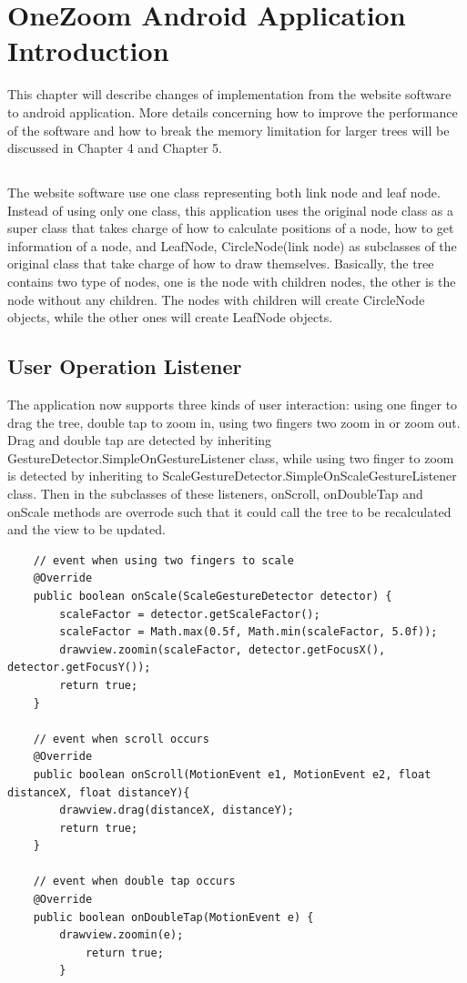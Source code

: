 \documentclass[MSc]{icldt}
\begin{document}
\chapter{OneZoom Android Application Introduction}

This chapter will describe changes of implementation from the website software to android application. More details concerning how to improve the performance of the software and how to break the memory limitation for larger trees will be discussed in Chapter 4 and Chapter 5.

\section{ }


The website software use one class representing both link node and leaf node. Instead of using only one class, this application uses the original node class as a super class that takes charge of how to calculate positions of a node, how to get information of a node, and LeafNode, CircleNode(link node) as subclasses of the original class that take charge of how to draw themselves. Basically, the tree contains two type of nodes, one is the node with children nodes, the other is the node without any children. The nodes with children will create CircleNode objects, while the other ones will create LeafNode objects. 

\section{User Operation Listener}

The application now supports three kinds of user interaction: using one finger to drag the tree, double tap to zoom in, using two fingers two zoom in or zoom out. Drag and double tap are detected by inheriting GestureDetector.SimpleOnGestureListener class, while using two finger to zoom is detected by inheriting to ScaleGestureDetector.SimpleOnScaleGestureListener class. Then in the subclasses of these listeners, onScroll, onDoubleTap and onScale methods are overrode such that it could call the tree to be recalculated and the view to be updated. 

\begin{lstlisting}
	// event when using two fingers to scale
	@Override
	public boolean onScale(ScaleGestureDetector detector) {
		scaleFactor = detector.getScaleFactor();
		scaleFactor = Math.max(0.5f, Math.min(scaleFactor, 5.0f));
		drawview.zoomin(scaleFactor, detector.getFocusX(), detector.getFocusY());
		return true;
	}
	
	// event when scroll occurs
	@Override
	public boolean onScroll(MotionEvent e1, MotionEvent e2, float distanceX, float distanceY){
		drawview.drag(distanceX, distanceY);
		return true;
	}
	
	// event when double tap occurs    
	@Override
	public boolean onDoubleTap(MotionEvent e) {
		drawview.zoomin(e);
    		return true;
        }

\end{lstlisting}
\end{document}
